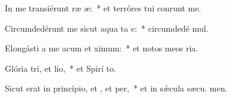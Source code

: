 \item In me transiérunt ræ æ:~* et terróres tui conrunt me.
\item Circumdedérunt me sicut aqua ta e:~* circumdedé  mul.
\item Elongásti a me acum et ximum:~* et notos meos  ria.
\item Glória tri, et lio,~* et Spirí to.
\item Sicut erat in princípio, et , et per,~* et in sǽcula sæcu. men.
